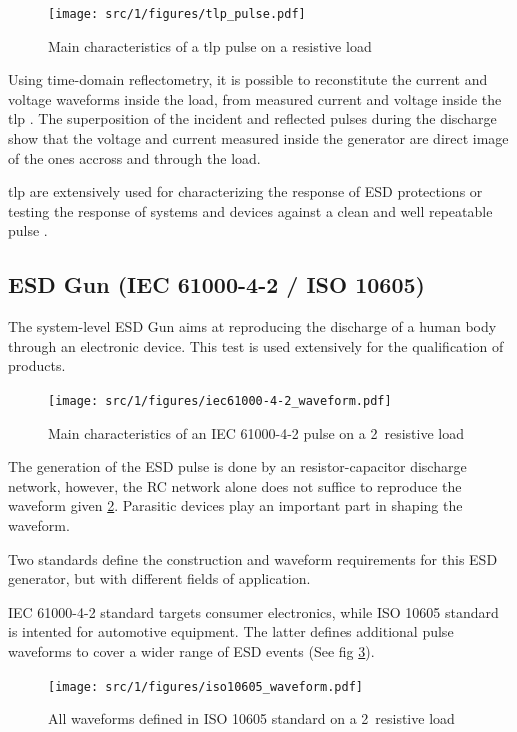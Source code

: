 \begin{figure}[!htbp]
  \centering
  \texttt{[image: src/1/figures/tlp\_pulse.pdf]}
  \caption{Main characteristics of a \gls{tlp} pulse on a resistive load}
  \label{tlp_pulse}
\end{figure}

Using time-domain reflectometry, it is possible to reconstitute the current and voltage waveforms inside the load,
from measured current and voltage inside the \gls{tlp} \cite{TLP}.
The superposition of the incident and reflected pulses during the discharge show that the voltage and current
measured inside the generator are direct image of the ones accross and through the load.

\gls{tlp} are extensively used for characterizing the response of ESD protections \cite{TLPforESDProtectionCz}
or testing the response of systems and devices against a clean and well repeatable pulse \cite{TLPthroubleshooting, LacrampeTransientImmunity}.

\subsection{ESD Gun (IEC 61000-4-2 / ISO 10605)}
The system-level ESD Gun aims at reproducing the discharge of a human body through an electronic device.
This test is used extensively for the qualification of products.

\begin{figure}[!htbp]
  \centering
  \texttt{[image: src/1/figures/iec61000-4-2\_waveform.pdf]}
  \caption{Main characteristics of an IEC 61000-4-2 pulse on a 2\textOmega\ resistive load}
  \label{iec_pulse}
\end{figure}

The generation of the ESD pulse is done by an resistor-capacitor discharge network, however, the RC network alone does not suffice to reproduce the waveform given \ref{iec_pulse}.
Parasitic devices play an important part in shaping the waveform.

Two standards define the construction and waveform requirements for this ESD generator, but with different fields of application.

IEC 61000-4-2\cite{iec61000-4-2} standard targets consumer electronics, while ISO 10605\cite{iso10605} standard is intented for automotive equipment.
The latter defines additional pulse waveforms to cover a wider range of ESD events (See fig \ref{iso_pulse}).

\begin{figure}[!htbp]
  \centering
  \texttt{[image: src/1/figures/iso10605\_waveform.pdf]}
  \caption{All waveforms defined in ISO 10605 standard on a 2\textOmega\ resistive load}
  \label{iso_pulse}
\end{figure}



